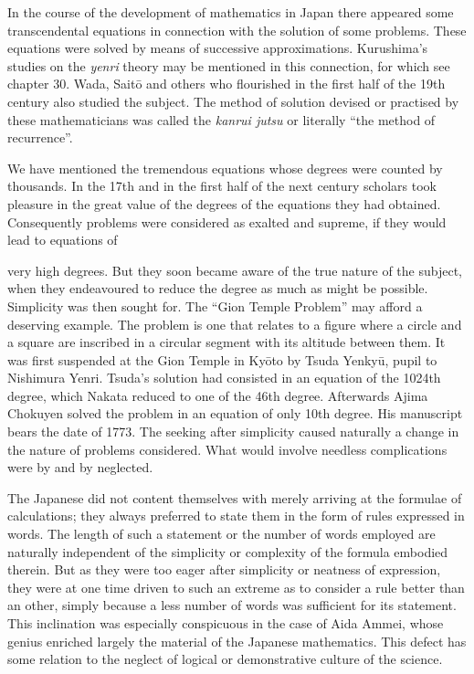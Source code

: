 \documentclass[11pt]{article}
\newcommand{\scanpage}[2]{\clearpage\setcounter{footnote}{0}\noindent{\footnotesize\color{gray}PDF page #1 · #2}\par\medskip}
\newcommand{\scanfooter}{}
\begin{document}
In the course of the development of mathematics in Japan there appeared some transcendental equations in connection with the solution of some problems. These equations were solved by means of successive approximations. Kurushima's studies on the \emph{yenri} theory may be mentioned in this connection, for which see chapter 30. Wada, Saitō and others who flourished in the first half of the 19th century also studied the subject. The method of solution devised or practised by these mathematicians was called the \emph{kanrui jutsu} or literally ``the method of recurrence''.

We have mentioned the tremendous equations whose degrees were counted by thousands. In the 17th and in the first half of the next century scholars took pleasure in the great value of the degrees of the equations they had obtained. Consequently problems were considered as exalted and supreme, if they would lead to equations of
\scanfooter

\scanpage{0182}{Chapter 22, printed page 168}
very high degrees. But they soon became aware of the true nature of the subject, when they endeavoured to reduce the degree as much as might be possible. Simplicity was then sought for. The ``Gion Temple Problem'' may afford a deserving example. The problem is one that relates to a figure where a circle and a square are inscribed in a circular segment with its altitude between them. It was first suspended at the Gion Temple in Kyōto by Tsuda Yenkyū, pupil to Nishimura Yenri. Tsuda's solution had consisted in an equation of the 1024th degree, which Nakata reduced to one of the 46th degree. Afterwards Ajima Chokuyen solved the problem in an equation of only 10th degree. His manuscript bears the date of 1773. The seeking after simplicity caused naturally a change in the nature of problems considered. What would involve needless complications were by and by neglected.

The Japanese did not content themselves with merely arriving at the formulae of calculations; they always preferred to state them in the form of rules expressed in words. The length of such a statement or the number of words employed are naturally independent of the simplicity or complexity of the formula embodied therein. But as they were too eager after simplicity or neatness of expression, they were at one time driven to such an extreme as to consider a rule better than an other, simply because a less number of words was sufficient for its statement. This inclination was especially conspicuous in the case of Aida Ammei, whose genius enriched largely the material of the Japanese mathematics. This defect has some relation to the neglect of logical or demonstrative culture of the science.
\end{document}
